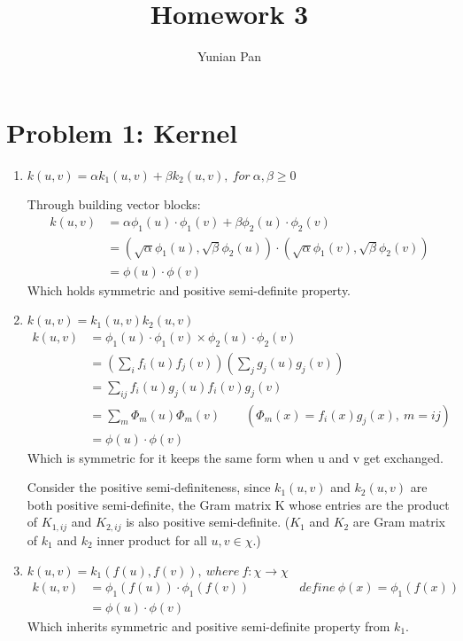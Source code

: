 \documentclass[a4paper,12pt]{article}
\begin{document}
\title{\textbf{Homework 3}}
\author{Yunian Pan}
\maketitle{}

\section{Problem 1: Kernel}

\begin{enumerate} [label = $\bullet$]
   \item $k(u,v) = \alpha k_1(u,v) + \beta k_2(u,v), \   for \ \alpha, \beta \geq 0$
   
   Through building vector blocks:
      \begin{align}
      k(u,v) & =  \alpha\phi_1(u) \cdot \phi_1(v) + \beta \phi_2(u) \cdot \phi_2(v)  \nonumber \\ 
       & = (\sqrt{\alpha} \phi_1(u) , \sqrt{\beta} \phi_2(u) ) \cdot (\sqrt{\alpha} \phi_1(v) , \sqrt{\beta} \phi_2(v) ) \nonumber \\
       & = \phi(u) \cdot \phi(v) \nonumber
      \end{align}
     Which holds symmetric and positive semi-definite property.
      
   \item $k(u,v) = k_1(u,v) k_2(u,v)$
     \begin{align}
      k(u,v) & =  \phi_1(u) \cdot \phi_1(v) \times \phi_2(u) \cdot \phi_2(v)  \nonumber \\ 
       & = ( \sum_{i}f_i(u)  f_j(v))  ( \sum_{j}g_j(u)  g_j(v)) \nonumber  \\
       & = \sum_{ij}f_i(u)g_j(u)  f_i(v) g_j(v) \nonumber \\
       & = \sum_{m} \Phi_m(u) \Phi_m(v)   \qquad (\Phi_m(x) = f_i(x)g_j(x), \ m = ij)\nonumber \\
       & = \phi(u)\cdot \phi(v ) \nonumber 
      \end{align}
      Which is symmetric for it keeps the same form when u and v get exchanged.
      
      Consider the positive semi-definiteness, since $k_1(u,v)$ and $k_2(u,v)$ are both positive semi-definite, the Gram matrix K whose entries are the product of $K_{1,ij}$ and $K_{2,ij}$ is also positive semi-definite. ($K_1$ and $K_2$ are  Gram matrix of $k_1$ and $k_2$ inner product for all $u,v\in \chi$.)
   
   \item $k(u,v) = k_1(f(u), f(v)) , \ where \ f: \chi \rightarrow \chi$
     \begin{align}
      k(u,v) & =  \phi_1(f(u)) \cdot \phi_1(f(v))  \qquad \qquad define \ \phi(x) = \phi_1(f(x)) \nonumber \\
      & = \phi(u) \cdot \phi(v) \nonumber
     \end{align}
     Which inherits symmetric and positive semi-definite property from $k_1$.
     

\end{enumerate}
\end{document}
